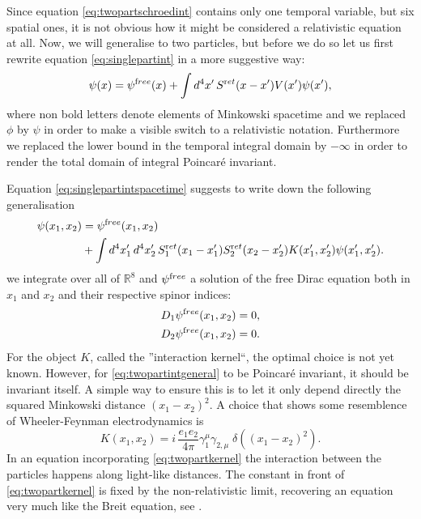 \documentclass[b5paper,draft,openbib,12pt]{memoir}
\newcommand{\ret}{{\textup ret}}
\newcommand{\free}{{\textup free}}
\begin{document}
Since equation \eqref{eq:twopartschroedint} contains 
only one temporal variable, but six spatial ones,
it is not obvious how it might be considered a 
relativistic equation at all. Now, we will 
generalise to two particles, but before we do so 
let us first rewrite equation 
\eqref{eq:singlepartint} in a more suggestive way:
\begin{equation}
	\psi(x) = \psi^\free(x) + \int d^4 x' \, S^\ret(x-x') V(x') \psi(x'),
	\label{eq:singlepartintspacetime}
\end{equation}
where non bold letters denote elements of Minkowski 
spacetime and we replaced \(\phi\)
by \(\psi\) in order to make a visible switch to 
a relativistic notation. 
Furthermore we replaced the lower bound in the 
temporal integral domain by \(-\infty\)
in order to render the total domain of integral Poincaré invariant.

Equation \eqref{eq:singlepartintspacetime} 
suggests to write down the
following generalisation
\begin{align}\label{eq:twopartintgeneral}
  \psi(x_1,x_2) &= \psi^\free(x_1,x_2) \\\nonumber
  &+ \int d^4 x_1'\, d^4 x_2' \, S^\ret_1(x_1-x_1') S^\ret_2(x_2-x_2') K(x_1',x_2') \psi(x_1',x_2').
\end{align}
we integrate over all of \(\mathbb{R}^8\) and \(\psi^\free\) a solution of the free 
Dirac equation both in \(x_1\) and \(x_2\) and their respective spinor indices:
\begin{align}
  D_1  \psi^\free(x_1,x_2) = 0,\\
  D_2  \psi^\free(x_1,x_2) = 0.
	\label{eq:freemultitime}
\end{align}
For the object \(K\), called the ''interaction kernel``, the optimal choice is not yet known.
However, for \eqref{eq:twopartintgeneral} to be Poincaré invariant, it should be invariant
itself. A simple way to ensure this is to let it only depend directly 
the squared Minkowski distance \((x_1-x_2)^2\). A choice that shows some resemblence of 
Wheeler-Feynman electrodynamics is
\begin{equation}
	K(x_1,x_2) = i\, \frac{e_1e_2}{4\pi} \gamma_1^\mu \gamma_{2,\mu} \; \delta((x_1-x_2)^2).
	\label{eq:twopartkernel}
\end{equation}
In an equation incorporating \eqref{eq:twopartkernel} the interaction between the particles 
happens along light-like distances. The constant in front of \eqref{eq:twopartkernel}
is fixed by the non-relativistic limit, recovering an equation very much like the Breit equation,
see \cite[section 3.6]{direct_interaction_quantum}.
\end{document}
